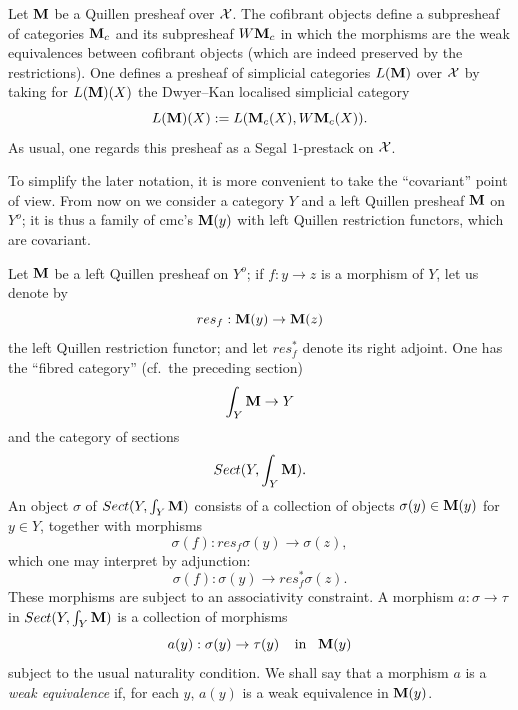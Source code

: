 Let ${\bf M}$ be a Quillen presheaf over ${\cal X}$. The cofibrant objects define a
subpresheaf of categories ${\bf M}_c$ and its subpresheaf $W{\bf M}_c$ in which
the morphisms are the weak equivalences between cofibrant objects (which are
indeed preserved by the restrictions). One defines a presheaf of simplicial
categories $L({\bf M})$ over ${\cal X}$ by taking for
$
L({\bf M})(X)
$
the Dwyer--Kan localised simplicial category
$$
L({\bf M} )(X):= L({\bf M}_c(X), W{\bf M}_c(X)).
$$
As usual, one regards this presheaf as a Segal $1$-prestack on ${\cal X}$.

To simplify the later notation, it is more convenient to take the ``covariant''
point of view. From now on we consider a category $Y$ and a left Quillen
presheaf ${\bf M}$ on $Y^o$; it is thus a family of cmc's ${\bf M} (y)$ with left
Quillen restriction functors, which are covariant.



Let ${\bf M}$ be a left Quillen presheaf on $Y^o$; if $f: y\rightarrow z$ is a
morphism of $Y$, let us denote by
$$
res_f: {\bf M} (y)\rightarrow {\bf M} (z)
$$
the left Quillen restriction functor; and let $res_f^{\ast}$ denote its right
adjoint. One has the ``fibred category'' (cf.\ the preceding section)
$$
\int _Y{\bf M} \rightarrow Y
$$
and the category of sections
$$
Sect (Y,\int _Y{\bf M} ).
$$
An object $\sigma$ of $Sect (Y,\int _Y{\bf M} )$ consists of a collection of
objects $\sigma (y)\in
{\bf M} (y)$ for $y\in Y$, together with morphisms
$$
\sigma (f): res_f\sigma (y)\rightarrow \sigma (z),
$$
which one may interpret by adjunction:
$$
\sigma (f): \sigma (y)\rightarrow res_f^{\ast}\sigma (z).
$$
These morphisms are subject to an associativity constraint.
A morphism $a:\sigma \rightarrow \tau$ in $Sect (Y,\int _Y{\bf M} )$
is a collection of morphisms
$$
a(y): \sigma (y)\rightarrow \tau (y)\;\;\;\; \mbox{in}\;\;\; {\bf M} (y)
$$
subject to the usual naturality condition.
We shall say that a morphism $a$ is a {\em weak equivalence} if, for each $y$,
$a(y)$ is a weak equivalence in ${\bf M} (y)$.

